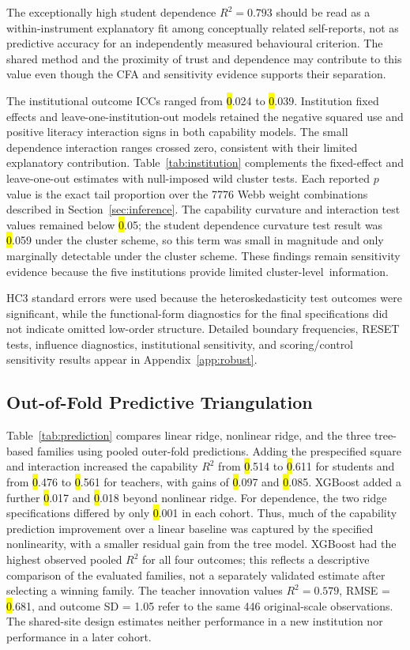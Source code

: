 \documentclass[sustainability,article,accept,moreauthors]{Definitions/mdpi}
\begin{document}
The exceptionally high student dependence $R^2=0.793$ should be read as a within-instrument explanatory fit among conceptually related self-reports, not as predictive accuracy for an independently measured behavioural criterion. The shared method and the proximity of trust and dependence may contribute to this value even though the CFA and sensitivity evidence supports their separation.

The institutional outcome ICCs ranged from \hl{0}.024 to \hl{0}.039. Institution fixed effects and leave-one-institution-out models retained the negative squared use and positive literacy interaction signs in both capability models. The small dependence interaction ranges crossed zero, consistent with their limited explanatory contribution. Table~\ref{tab:institution} complements the fixed-effect and leave-one-out estimates with null-imposed wild cluster tests. Each reported $p$ value is the exact tail proportion over the 7776 Webb weight combinations described in Section~\ref{sec:inference}. The capability curvature and interaction test values remained below \hl{0}.05; the student dependence curvature test result was \hl{0}.059 under the cluster scheme, so this term was small in magnitude and only marginally detectable under the cluster scheme. These findings remain sensitivity evidence because the five institutions provide limited cluster-level~information.

HC3 standard errors were used because the heteroskedasticity test outcomes were significant, while the functional-form diagnostics for the final specifications did not indicate omitted low-order structure. Detailed boundary frequencies, RESET tests, influence diagnostics, institutional sensitivity, and scoring/control sensitivity results appear in Appendix~\ref{app:robust}.

\subsection{Out-of-Fold Predictive Triangulation}\label{sec:predictionresults}

Table~\ref{tab:prediction} compares linear ridge, nonlinear ridge, and the three tree-based families using pooled outer-fold predictions. Adding the prespecified square and interaction increased the capability $R^2$ from \hl{0}.514 to \hl{0}.611 for students and from \hl{0}.476 to \hl{0}.561 for teachers, with gains of \hl{0}.097 and \hl{0}.085. XGBoost added a further \hl{0}.017 and \hl{0}.018 beyond nonlinear ridge. For dependence, the two ridge specifications differed by only \hl{0}.001 in each cohort. Thus, much of the capability prediction improvement over a linear baseline was captured by the specified nonlinearity, with a smaller residual gain from the tree model. XGBoost had the highest observed pooled $R^2$ for all four outcomes; this reflects a descriptive comparison of the evaluated families, not a separately validated estimate after selecting a winning family. The teacher innovation values $R^2=0.579$, RMSE = \hl{0}.681, and outcome SD = 1.05 refer to the same 446 original-scale observations. The shared-site design estimates neither performance in a new institution nor performance in a later cohort.
\end{document}
